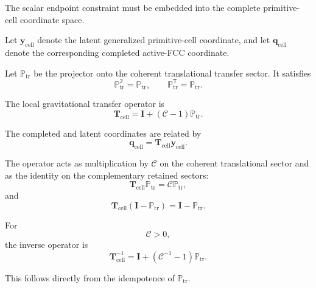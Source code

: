 The scalar endpoint constraint must be embedded into the complete primitive-cell coordinate space.

Let $\mathbf{y}_{\mathrm{cell}}$ denote the latent generalized primitive-cell coordinate, and let $\mathbf{q}_{\mathrm{cell}}$ denote the corresponding completed active-FCC coordinate.

Let $\mathbb{P}_{\mathrm{tr}}$ be the projector onto the coherent translational transfer sector. It satisfies
\begin{equation}
    \mathbb{P}_{\mathrm{tr}}^2 = \mathbb{P}_{\mathrm{tr}}, \qquad \mathbb{P}_{\mathrm{tr}}^{\mathsf{T}} = \mathbb{P}_{\mathrm{tr}}.
\end{equation}

The local gravitational transfer operator is
\begin{equation}
    \mathbf{T}_{\mathrm{cell}} = \mathbf{I} + \left( \mathcal{C}-1 \right) \mathbb{P}_{\mathrm{tr}}.
    \label{eq:cell_transfer_operator}
\end{equation}

The completed and latent coordinates are related by
\begin{equation}
    \mathbf{q}_{\mathrm{cell}} = \mathbf{T}_{\mathrm{cell}} \mathbf{y}_{\mathrm{cell}}.
    \label{eq:cell_coordinate_map}
\end{equation}

The operator acts as multiplication by $\mathcal{C}$ on the coherent translational sector and as the identity on the complementary retained sectors:
\begin{equation}
    \mathbf{T}_{\mathrm{cell}} \mathbb{P}_{\mathrm{tr}} = \mathcal{C}\mathbb{P}_{\mathrm{tr}},
\end{equation}
and
\begin{equation}
    \mathbf{T}_{\mathrm{cell}} \left( \mathbf{I}-\mathbb{P}_{\mathrm{tr}} \right) = \mathbf{I}-\mathbb{P}_{\mathrm{tr}}.
\end{equation}

For
\begin{equation}
    \mathcal{C} > 0,
\end{equation}
the inverse operator is
\begin{equation}
    \mathbf{T}_{\mathrm{cell}}^{-1} = \mathbf{I} + \left( \mathcal{C}^{-1}-1 \right) \mathbb{P}_{\mathrm{tr}}.
    \label{eq:cell_transfer_inverse}
\end{equation}

This follows directly from the idempotence of $\mathbb{P}_{\mathrm{tr}}$.

